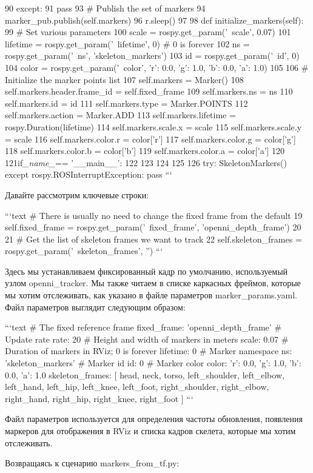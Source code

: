 90 except:
91 pass
93 # Publish the set of markers
94 marker_pub.publish(self.markers)
96 r.sleep() 97
98 def initialize_markers(self):
99 # Set various parameters
100 scale = rospy.get_param('~scale', 0.07)
101 lifetime = rospy.get_param('~lifetime', 0) # 0 is forever
102 ns = rospy.get_param('~ns', 'skeleton_markers')
103 id = rospy.get_param('~id', 0)
104 color = rospy.get_param('~color', {'r': 0.0, 'g': 1.0, 'b': 0.0, 'a':
1.0}) 105
106 # Initialize the marker points list
107 self.markers = Marker()
108 self.markers.header.frame_id = self.fixed_frame
109 self.markers.ns = ns
110 self.markers.id = id
111 self.markers.type = Marker.POINTS
112 self.markers.action = Marker.ADD
113 self.markers.lifetime = rospy.Duration(lifetime)
114 self.markers.scale.x = scale
115 self.markers.scale.y = scale
116 self.markers.color.r = color['r']
117 self.markers.color.g = color['g']
118 self.markers.color.b = color['b']
119 self.markers.color.a = color['a']
120
121if\textit{_name_}== '__main__':
122 123 124 125 126
try:
    SkeletonMarkers()
except rospy.ROSInterruptException: pass
```

Давайте рассмотрим ключевые строки:

```text
# There is usually no need to change the fixed frame from the default
19 self.fixed_frame = rospy.get_param('~fixed_frame',
'openni_depth_frame') 20
21 # Get the list of skeleton frames we want to track
22 self.skeleton_frames = rospy.get_param('~skeleton_frames', '')
```

Здесь мы устанавливаем фиксированный кадр по умолчанию, используемый узлом openni\_tracker. Мы также читаем в списке каркасных фреймов, которые мы хотим отслеживать, как указано в файле параметров marker\_params.yaml. Файл параметров выглядит следующим образом:

```text
# The fixed reference frame
fixed_frame: 'openni_depth_frame'
# Update rate
rate: 20
# Height and width of markers in meters scale: 0.07
# Duration of markers in RViz; 0 is forever
lifetime: 0
# Marker namespace
ns: 'skeleton_markers'
# Marker id
id: 0
# Marker color
color: { 'r': 0.0, 'g': 1.0, 'b': 0.0, 'a': 1.0 }
skeleton_frames: [
head,
neck,
torso,
left_shoulder,
left_elbow,
left_hand,
left_hip,
left_knee,
left_foot,
right_shoulder,
right_elbow,
right_hand,
right_hip,
right_knee,
right_foot
]
```

Файл параметров используется для определения частоты обновления, появления маркеров для отображения в RViz и списка кадров скелета, которые мы хотим отслеживать.

Возвращаясь к сценарию markers\_from\_tf.py:

